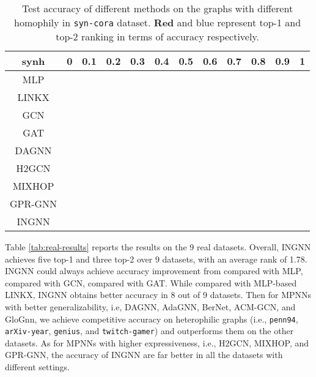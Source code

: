 \documentclass{article}
\theoremstyle{plain}
\newcommand{\pjn}{{INGNN}}
\begin{document}
\begin{table*}[h]
\centering
\caption{Test accuracy of different methods on the graphs with different homophily in \texttt{syn-cora} dataset. {\color{red} \textbf{Red}} and {\color{blue} blue} represent top-1 and top-2 ranking in terms of accuracy respectively.}
\label{tab:syn-cora-results}
\scriptsize
\tabcolsep=0.12cm
\begin{tabular}{c|ccccccccccc}
\toprule
synh   & 0    & 0.1    & 0.2    & 0.3    & 0.4    & 0.5    & 0.6    & 0.7    & 0.8    & 0.9    & 1    \\
\midrule
\midrule
MLP	& 	  & 	 & 	 & 	 & 	  & 	 & 	 & 	 & 	 & 	 & 	 \\
LINKX  & 	 & 	 & 	 & 	 & 	 & 	 & 	 & 	 & 	 & 	 & 	 \\
GCN	& 	 & 	 & 	 & 	 & 	  & 	 & 	 & 	 & 	 & 	 & 	 \\
GAT	& 	 & 	 & 	 & 	 & 	 & 	 & 	 & 	 & 	 & 	 & {\color[HTML]{FF0000} } \\
DAGNN  & 	 & 	 & 	 & 	 & 	 & 	 & 	 & 	 & 	 & {\color[HTML]{FF0000} } & {\color[HTML]{0000FF} }	  \\
H2GCN  & {\color[HTML]{FF0000} } & {\color[HTML]{FF0000} } & {\color[HTML]{0000FF} }	  & {\color[HTML]{0000FF} }	  & {\color[HTML]{0000FF} }	  & {\color[HTML]{0000FF} }	  & {\color[HTML]{0000FF} }	  & {\color[HTML]{FF0000} } & 	 & 	 & 	 \\
MIXHOP & 	 & 	 & 	 & 	 & 	 & 	 & 	 & 	 & 	 & 	 & {\color[HTML]{FF0000} } \\
GPR-GNN & 	 & 	 & 	 & 	 & 	 & 	 & 	 & 	 & {\color[HTML]{0000FF} }	  & {\color[HTML]{0000FF} }	  & {\color[HTML]{FF0000} } \\ \hline 
\pjn{}   & {\color[HTML]{0000FF} }	  & {\color[HTML]{0000FF} }	  & {\color[HTML]{FF0000} } & {\color[HTML]{FF0000} } & {\color[HTML]{FF0000} } & {\color[HTML]{FF0000} } & {\color[HTML]{FF0000} } & {\color[HTML]{0000FF} }	  & {\color[HTML]{FF0000} } & 	 & {\color[HTML]{0000FF} }	 \\
\bottomrule

\end{tabular}
\vspace{-10pt}
\end{table*}

Table \ref{tab:real-results} reports the results on the 9 real datasets. Overall, \pjn{} achieves five top-1 and three top-2 over 9 datasets, with an average rank of 1.78.
\pjn{} could always achieve accuracy improvement from  compared with MLP,  compared with GCN,  compared with GAT. While compared with MLP-based LINKX, \pjn{} obtains better accuracy in 8 out of 9 datasets.
Then for MPNNs with better generalizability, i.e, DAGNN, AdaGNN, BerNet, ACM-GCN, and GloGnn, we achieve competitive accuracy on heterophilic graphs (i.e., \texttt{penn94}, \texttt{arXiv-year}, \texttt{genius}, and \texttt{twitch-gamer}) and outperforms them on the other datasets.
As for MPNNs with higher expressiveness, i.e., H2GCN, MIXHOP, and GPR-GNN, the accuracy of \pjn{} are far better in all the datasets with different settings.
\end{document}
